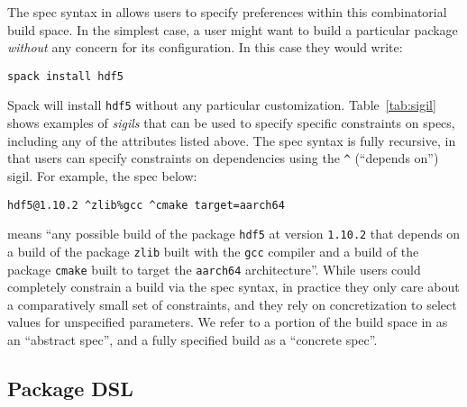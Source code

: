 

The spec syntax in \spack allows users to specify preferences within this combinatorial
build space. In the simplest case, a user might want to build a particular package {\it
  without} any concern for its configuration. In this case they would write:
\begin{verbatim}
spack install hdf5
\end{verbatim}
Spack will install {\tt hdf5} without any particular customization.
Table~\ref{tab:sigil} shows examples of {\it sigils} that can be used to specify
specific constraints on specs, including any of the attributes listed above. The spec
syntax is fully recursive, in that users can specify constraints on dependencies using
the {\tt \^{}} (``depends on'') sigil. For example, the spec below:
\begin{verbatim}
hdf5@1.10.2 ^zlib%gcc ^cmake target=aarch64
\end{verbatim}
means ``any possible build of the package \texttt{hdf5} at version {\tt 1.10.2} that
depends on a build of the package \texttt{zlib} built with the \texttt{gcc} compiler and
a build of the package \texttt{cmake} built to target the \texttt{aarch64}
architecture''. While users could completely constrain a build via the spec syntax, in
practice they only care about a comparatively small set of constraints, and they rely on
concretization to select values for unspecified parameters. We refer to a portion of the
build space in \spack as an ``abstract spec'', and a fully specified build as a
``concrete spec''.

\subsection{Package DSL}
\label{sec:package-dsl}

